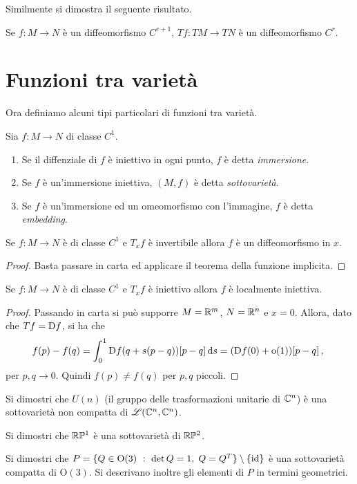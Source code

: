 Similmente si dimostra il seguente risultato.

\begin{proposition}
	Se $f:M\to N$ è un diffeomorfismo $C^{r+1}$, $Tf:TM\to TN$ è un diffeomorfismo $C^r$.
\end{proposition}

\section{Funzioni tra varietà}
Ora definiamo alcuni tipi particolari di funzioni tra varietà.
 
\begin{definition}
	Sia $f:M\to N$ di classe $C^1$.
	\begin{enumerate}
	\item Se il diffenziale di $f$ è iniettivo in ogni punto, $f$ è detta \emph{immersione}. 
	\item Se $f$ è un'immersione iniettiva, $(M,f)$ è detta \emph{sottovarietà}. 
	\item Se $f$ è un'immersione ed un omeomorfismo con l'immagine, $f$ è detta \emph{embedding}. 
	\end{enumerate}
\end{definition}

\begin{proposition}
	Se $f:M\to N$ è di classe $C^1$ e $T_xf$ è invertibile allora $f$ è un diffeomorfismo in $x$.
\end{proposition}

 \begin{proof}
  Basta passare in carta ed applicare il teorema della funzione implicita.
 \end{proof}

\begin{proposition}
	Se $f:M\to N$ è di classe $C^1$ e $T_xf$ è iniettivo allora $f$ è localmente iniettiva.
\end{proposition}

\begin{proof}
	Passando in carta si può supporre $M=\mathbb R^m$, $N=\mathbb R^n$ e $x=0$. Allora, dato che $Tf=\mathrm D f$, si ha che
	\begin{equation*}
	f(p)-f(q)=\int_0^1\mathrm D f(q+s(p-q))[p-q]\,\mathrm d s=(\mathrm D f(0)+\mathrm{o}(1))[p-q]\, \text{, }
	\end{equation*}
	per $p,q\to 0$. Quindi $f(p)\ne f(q)$ per $p,q$ piccoli.
\end{proof}

\begin{exercise}
	Si dimostri che $U(n)$ (il gruppo delle trasformazioni unitarie di $\mathbb C^n$) è una sottovarietà non compatta di $\mathscr L(\mathbb C^n,\mathbb C^n)$.
\end{exercise}
\begin{exercise}
	Si dimostri che $\mathbb R \mathbb P^1$ è una sottovarietà di $\mathbb R \mathbb P^2$.
\end{exercise}
\begin{exercise}
	Si dimostri che $P=\{ Q\in \mathrm O(3)\ :\ \det Q=1,\; Q=Q^T\}\setminus\{\id\}$ è una sottovarietà compatta di $\mathrm O(3)$. Si descrivano inoltre gli elementi di $P$ in termini geometrici.
\end{exercise}